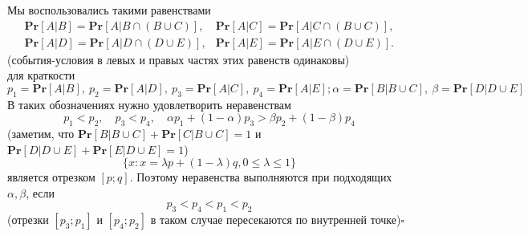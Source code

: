 \documentclass[a4paper]{article}
\newcommand{\qed}{\hfill$\square$}
\begin{document}
Мы воспользовались такими равенствами
$$
\begin{array}{ll}
\textbf{Pr}[A | B]=\textbf{Pr}[A | B \cap(B \cup C)], & \textbf{Pr}[A | C]=\textbf{Pr}[A | C \cap(B \cup C)], \\
\textbf{Pr}[A | D]=\textbf{Pr}[A | D \cap(D \cup E)], & \textbf{Pr}[A | E]=\textbf{Pr}[A | E \cap(D \cup E)] .
\end{array}
$$
(события-условия в левых и правых частях этих равенств одинаковы)\\
 для краткости
$$
p_1 =\textbf{Pr}[A | B],\ p_2 =\textbf{Pr}[A | D],\ p_3=\textbf{Pr}[A | C],\ p_4=\textbf{Pr}[A | E];
\alpha =\textbf{Pr}[B | B \cup C],\ \beta =\textbf{Pr}[D | D \cup E]
$$
В таких обозначениях нужно удовлетворить неравенствам
$$
p_1<p_2, \quad p_3<p_4, \quad \alpha p_1+(1-\alpha) p_3>\beta p_2+(1-\beta) p_4
$$
(заметим, что $\textbf{Pr}[B | B \cup C]+\textbf{Pr}[C | B \cup C]=1$ и $\textbf{Pr}[D | D \cup E]+\textbf{Pr}[E | D \cup E]=1$)\\
$$
\{x: x=\lambda p+(1-\lambda) q, 0 \leqslant \lambda \leqslant 1\}
$$
является отрезком $[p ; q]$. Поэтому неравенства выполняются при подходящих $\alpha, \beta$, если
$$
p_3<p_4<p_1<p_2
$$
(отрезки $\left[p_3 ; p_1\right]$ и $\left[p_4 ; p_2\right]$ в таком случае пересекаются по внутренней точке)\qed
\end{document}
